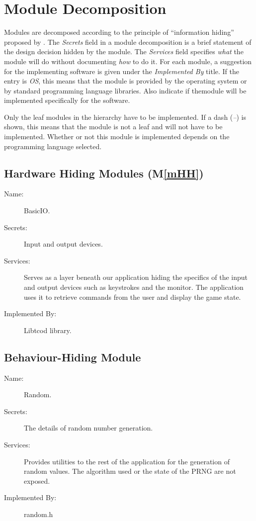 \documentclass[12pt, titlepage]{article}
\newcommand{\newSection}[1]{
  \newpage
  \section{#1}
}
\newcommand{\mref}[1]{M\ref{#1}}
\begin{document}
\newSection{Module Decomposition} \label{SecMD}

	Modules are decomposed according to the principle of ``information hiding'' proposed by \citet{ParnasEtAl1984}. The \emph{Secrets} field in a module decomposition is a brief statement of the design decision hidden by the module. The \emph{Services} field specifies \emph{what} the module will do without documenting \emph{how} to do it. For each module, a suggestion for the implementing software is given under the \emph{Implemented By} title. If the entry is \emph{OS}, this means that the module is provided by the operating system or by standard programming language libraries.  Also indicate if themodule will be implemented specifically for the software.

	Only the leaf modules in the hierarchy have to be implemented. If a dash (\emph{--}) is shown, this means that the module is not a leaf and will not have to be implemented. Whether or not this module is implemented depends on the programming language selected.

	\subsection{Hardware Hiding Modules (\mref{mHH})}

		\bigskip\begin{description}
			\item[Name:]BasicIO.
			\item[Secrets:]Input and output devices.
			\item[Services:]Serves as a layer beneath our application hiding the specifics of the
			input and output devices such as keystrokes and the monitor. The application uses it
			to retrieve commands from the user and display the game state.
			\item[Implemented By:] Libtcod library.
		\end{description}

	\subsection{Behaviour-Hiding Module}

		\bigskip\begin{description}
			\item[Name:]Random.
			\item[Secrets:]The details of random number generation.
			\item[Services:]Provides utilities to the rest of the application for the generation of random
			values. The algorithm used or the state of the PRNG are not exposed.
			\item[Implemented By:] random.h
		\end{description}
\end{document}
